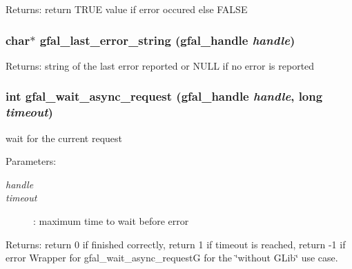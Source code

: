 \begin{Desc}
\item[Returns:]return TRUE value if error occured else FALSE \end{Desc}
\subsubsection{\setlength{\rightskip}{0pt plus 5cm}char$\ast$ gfal\_\-last\_\-error\_\-string (gfal\_\-handle {\em handle})}\label{gfal__common__interface_8h_bdebd69c0c6a74b1b5adf88b5e836d8a}


\begin{Desc}
\item[Returns:]string of the last error reported or NULL if no error is reported \end{Desc}
\subsubsection{\setlength{\rightskip}{0pt plus 5cm}int gfal\_\-wait\_\-async\_\-request (gfal\_\-handle {\em handle}, long {\em timeout})}\label{gfal__common__interface_8h_08c8573e050334d5342a31a48b7db4cb}


wait for the current request 

\begin{Desc}
\item[Parameters:]
\begin{description}
\item[{\em handle}]\item[{\em timeout}]: maximum time to wait before error \end{description}
\end{Desc}
\begin{Desc}
\item[Returns:]return 0 if finished correctly, return 1 if timeout is reached, return -1 if error Wrapper for gfal\_\-wait\_\-async\_\-request\-G for the \char`\"{}without GLib\char`\"{} use case. \end{Desc}
